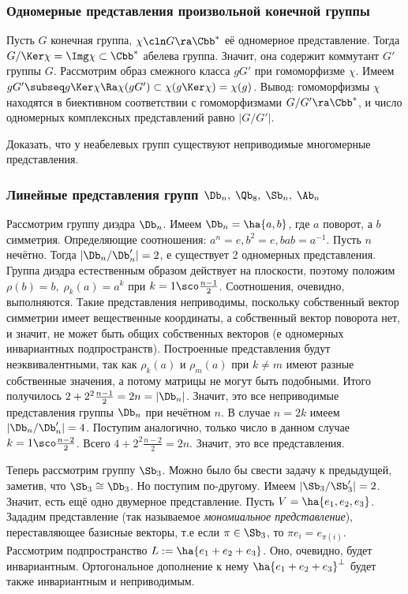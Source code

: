 \documentclass[a4paper]{article}
\begin{document}
\subsubsection{Одномерные представления произвольной конечной группы}

Пусть $G$ конечная группа, $\chi\cln G \ra \Cbb^*$ её одномерное представление.  Тогда $G/\Ker \chi =
\Img \chi \subset \Cbb^*$ абелева группа. Значит, она содержит коммутант $G'$ группы $G$. Рассмотрим
образ смежного класса $gG'$ при гомоморфизме $\chi$. Имеем $gG' \subseq g\Ker \chi \Ra \chi(gG') \subset
\chi(g \Ker \chi)=\chi(g)$. Вывод: гомоморфизмы $\chi$ находятся в биективном соответствии с гомоморфизмами
$G/G' \ra \Cbb^*$, и число одномерных комплексных представлений равно $|G/G'|$.

\begin{problem}
Доказать, что у неабелевых групп существуют неприводимые многомерные представления.
\end{problem}

\subsubsection{Линейные представления групп $\Db_n, \; \Qb_8, \; \Sb_n, \; \Ab_n$}

Рассмотрим группу диэдра $\Db_n$. Имеем $\Db_n=\ha{a,b}$, где $a$ поворот, а $b$ симметрия.
Определяющие соотношения: $a^n=e, b^2=e, bab=a^{-1}$. Пусть $n$ нечётно. Тогда $|\Db_n/\Db_n'|=2$, е
существует 2 одномерных представления. Группа диэдра естественным образом действует на плоскости, поэтому
положим $\rho(b)=b, \; \rho_k(a)=a^k$ при $k=1 \sco \frac{n-1}{2}$. Соотношения, очевидно, выполняются. Такие
представления неприводимы, поскольку собственный вектор симметрии имеет вещественные координаты, а
собственный вектор поворота нет, и значит, не может быть общих собственных векторов (е одномерных
инвариантных подпространств). Построенные представления будут неэквивалентными, так как $\rho_k(a)$ и
$\rho_m(a)$ при $k \neq m$ имеют разные собственные значения, а потому матрицы не могут быть подобными. Итого
получилось $2+2^2 \frac{n-1}{2}=2n=|\Db_n|$. Значит, это все неприводимые представления группы $\Db_n$ при
нечётном $n$. В случае $n=2k$ имеем $|\Db_n/\Db_n'|=4$. Поступим аналогично, только число в данном случае $k
= 1 \sco \frac{n-2}{2}$. Всего $4+2^2 \frac{n-2}{2}=2n$. Значит, это все представления.

Теперь рассмотрим группу $\Sb_3$. Можно было бы свести задачу к предыдущей, заметив,  что $\Sb_3 \cong
\Db_3$. Но поступим по-другому. Имеем $|\Sb_3/\Sb_3'|=2$. Значит, есть ещё одно двумерное представление.
Пусть $V=\ha{e_1, e_2, e_3}$. Зададим представление (так называемое \emph{\emph{мономиальное
представление}}), переставляющее базисные векторы, т.е если $\pi \in \Sb_3$, то $\pi e_i = e_{\pi(i)}$.
Рассмотрим подпространство $L:=\ha{e_1+e_2+e_3}$. Оно, очевидно, будет инвариантным. Ортогональное дополнение
к нему $\ha{e_1+e_2+e_3}^\bot$ будет также инвариантным и неприводимым.
\end{document}
